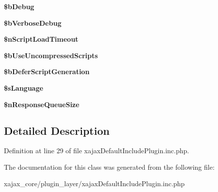 \begin{DoxyCompactItemize}
\item 
\hypertarget{classxajaxIncludeClientScriptPlugin_a6549a840e0e2ce32fd56bbf83846d3c1}{
{\bfseries \$bDebug}}
\label{classxajaxIncludeClientScriptPlugin_a6549a840e0e2ce32fd56bbf83846d3c1}

\item 
\hypertarget{classxajaxIncludeClientScriptPlugin_a41057bacc00b4708a5984ae163901ced}{
{\bfseries \$bVerboseDebug}}
\label{classxajaxIncludeClientScriptPlugin_a41057bacc00b4708a5984ae163901ced}

\item 
\hypertarget{classxajaxIncludeClientScriptPlugin_a5cfbaa3db4052b79ca9cb5873dafc7ae}{
{\bfseries \$nScriptLoadTimeout}}
\label{classxajaxIncludeClientScriptPlugin_a5cfbaa3db4052b79ca9cb5873dafc7ae}

\item 
\hypertarget{classxajaxIncludeClientScriptPlugin_a9208da09d06d59de1be2d5ddc5e619e8}{
{\bfseries \$bUseUncompressedScripts}}
\label{classxajaxIncludeClientScriptPlugin_a9208da09d06d59de1be2d5ddc5e619e8}

\item 
\hypertarget{classxajaxIncludeClientScriptPlugin_a55b96dc423ec2979e1d385faade26ab7}{
{\bfseries \$bDeferScriptGeneration}}
\label{classxajaxIncludeClientScriptPlugin_a55b96dc423ec2979e1d385faade26ab7}

\item 
\hypertarget{classxajaxIncludeClientScriptPlugin_addefc65c614fcb6d1440d3ba2d70210f}{
{\bfseries \$sLanguage}}
\label{classxajaxIncludeClientScriptPlugin_addefc65c614fcb6d1440d3ba2d70210f}

\item 
\hypertarget{classxajaxIncludeClientScriptPlugin_a072ee5747e717c2707d9bb50709a4583}{
{\bfseries \$nResponseQueueSize}}
\label{classxajaxIncludeClientScriptPlugin_a072ee5747e717c2707d9bb50709a4583}

\end{DoxyCompactItemize}


\subsection{Detailed Description}


Definition at line 29 of file xajaxDefaultIncludePlugin.inc.php.



The documentation for this class was generated from the following file:\begin{DoxyCompactItemize}
\item 
xajax\_\-core/plugin\_\-layer/xajaxDefaultIncludePlugin.inc.php\end{DoxyCompactItemize}
